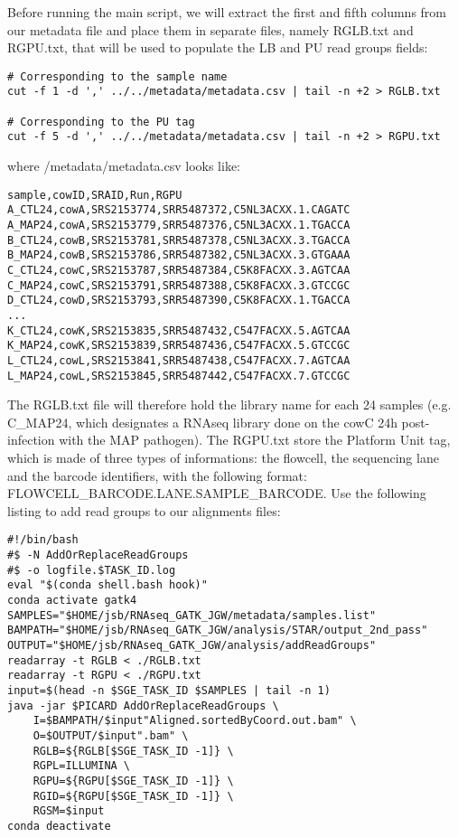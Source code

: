 Before running the main script, we will extract the first and fifth columns from our metadata file and place them in separate files, namely RGLB.txt and  RGPU.txt, that will be used to populate the LB and PU read groups fields:

\begin{verbatim}
# Corresponding to the sample name
cut -f 1 -d ',' ../../metadata/metadata.csv | tail -n +2 > RGLB.txt

# Corresponding to the PU tag 
cut -f 5 -d ',' ../../metadata/metadata.csv | tail -n +2 > RGPU.txt
\end{verbatim}

where /metadata/metadata.csv looks like:

\begin{verbatim}
sample,cowID,SRAID,Run,RGPU
A_CTL24,cowA,SRS2153774,SRR5487372,C5NL3ACXX.1.CAGATC
A_MAP24,cowA,SRS2153779,SRR5487376,C5NL3ACXX.1.TGACCA
B_CTL24,cowB,SRS2153781,SRR5487378,C5NL3ACXX.3.TGACCA
B_MAP24,cowB,SRS2153786,SRR5487382,C5NL3ACXX.3.GTGAAA
C_CTL24,cowC,SRS2153787,SRR5487384,C5K8FACXX.3.AGTCAA
C_MAP24,cowC,SRS2153791,SRR5487388,C5K8FACXX.3.GTCCGC
D_CTL24,cowD,SRS2153793,SRR5487390,C5K8FACXX.1.TGACCA
...
K_CTL24,cowK,SRS2153835,SRR5487432,C547FACXX.5.AGTCAA
K_MAP24,cowK,SRS2153839,SRR5487436,C547FACXX.5.GTCCGC
L_CTL24,cowL,SRS2153841,SRR5487438,C547FACXX.7.AGTCAA
L_MAP24,cowL,SRS2153845,SRR5487442,C547FACXX.7.GTCCGC
\end{verbatim}


The RGLB.txt file will therefore hold the library name for each 24 samples (e.g. C\_MAP24, which designates a RNAseq library done on the cowC 24h post-infection with the MAP pathogen). The RGPU.txt store the Platform Unit tag, which is made of three types of informations: the flowcell, the sequencing lane and the barcode identifiers, with the following format: {FLOWCELL\_BARCODE}.{LANE}.{SAMPLE\_BARCODE}. Use the following listing to add read groups to our alignments files:


\begin{verbatim}
#!/bin/bash
#$ -N AddOrReplaceReadGroups
#$ -o logfile.$TASK_ID.log
eval "$(conda shell.bash hook)"
conda activate gatk4
SAMPLES="$HOME/jsb/RNAseq_GATK_JGW/metadata/samples.list"
BAMPATH="$HOME/jsb/RNAseq_GATK_JGW/analysis/STAR/output_2nd_pass"
OUTPUT="$HOME/jsb/RNAseq_GATK_JGW/analysis/addReadGroups"
readarray -t RGLB < ./RGLB.txt
readarray -t RGPU < ./RGPU.txt
input=$(head -n $SGE_TASK_ID $SAMPLES | tail -n 1)
java -jar $PICARD AddOrReplaceReadGroups \
	I=$BAMPATH/$input"Aligned.sortedByCoord.out.bam" \
	O=$OUTPUT/$input".bam" \
	RGLB=${RGLB[$SGE_TASK_ID -1]} \
	RGPL=ILLUMINA \
	RGPU=${RGPU[$SGE_TASK_ID -1]} \
	RGID=${RGPU[$SGE_TASK_ID -1]} \
	RGSM=$input
conda deactivate
\end{verbatim}

